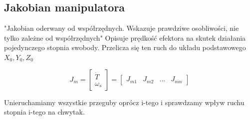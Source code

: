 \documentclass{article}
\begin{document}
\subsection{Jakobian manipulatora}

"Jakobian oderwany od współrzędnych. Wskazuje prawdziwe osobliwości, nie tylko zależne od współrzędnych"
Opisuje prędkość efektora na skutek działania pojedynczego stopnia swobody.
Przelicza się ten ruch do układu podstawowego $X_0, Y_0, Z_0$

$$  J_m =
    \begin{bmatrix}
        \dot{T} \\
        \omega_s
    \end{bmatrix}
    = \begin{bmatrix}
        J_{m1} & J_{m2} & ... & J_{mn}
    \end{bmatrix}
$$

Unieruchamiamy wszystkie przeguby oprócz i-tego i sprawdzamy wpływ ruchu stopnia i-tego na chwytak.
\end{document}
